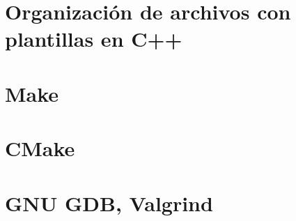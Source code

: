 \section{Organización de archivos con plantillas en C++}


\section{Make}

\section{CMake}


\section{GNU GDB, Valgrind}